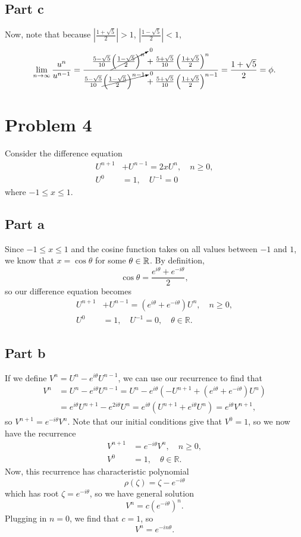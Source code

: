 \documentclass{article}
\begin{document}
\subsection{Part c}
Now, note that because $\left|\frac{1+\sqrt{5}}{2}\right|>1$, $\left|\frac{1-\sqrt{5}}{2}\right|<1$,
\begin{align*}
\lim_{n\to\infty}\frac{u^n}{u^{n-1}}=\frac{\frac{5-\sqrt{5}}{10}\cancelto{0}{\left(\frac{1-\sqrt{5}}{2}\right)^n}+\frac{5+\sqrt{5}}{10}\left(\frac{1+\sqrt{5}}{2}\right)^n}{\frac{5-\sqrt{5}}{10}\cancelto{0}{\left(\frac{1-\sqrt{5}}{2}\right)^{n-1}}+\frac{5+\sqrt{5}}{10}\left(\frac{1+\sqrt{5}}{2}\right)^{n-1}}=\frac{1+\sqrt{5}}{2}=\phi.
\end{align*}

\section{Problem 4}
Consider the difference equation
\begin{align*}
	U^{n+1} &+ U^{n-1} = 2x U^n, \quad n \geq 0,\\
	U^0 &= 1, \quad U^{-1} = 0
\end{align*}
where $-1 \leq x \leq 1$.

\subsection{Part a}
Since $-1 \leq x \leq 1$ and the cosine function takes on all values between $-1$ and $1$, we know that $x=\cos\theta$ for some $\theta\in\mathbb{R}$. By definition,
\[
\cos\theta=\frac{e^{i\theta}+e^{-i\theta}}{2},
\]
so our difference equation becomes
\begin{align*}
	U^{n+1} &+ U^{n-1} = (e^{i \theta} + e^{- i \theta}) U^n, \quad n \geq 0,\\
	U^0 &= 1, \quad U^{-1} = 0, \quad \theta \in \mathbb R.
\end{align*}

\subsection{Part b}
If we define $V^n = U^n - e^{i \theta} U^{n-1}$, we can use our recurrence to find that
\begin{align*}
V^n &= U^n - e^{i \theta} U^{n-1}=U^n -e^{i \theta}(-U^{n+1}+(e^{i \theta} + e^{- i \theta}) U^n)\\&=
e^{i\theta}U^{n+1}-e^{2i\theta}U^n=e^{i\theta}(U^{n+1}+e^{i\theta}U^n)=e^{i\theta}V^{n+1},
\end{align*}
so $V^{n+1}=e^{-i\theta}V^n$. Note that our initial conditions give that $V^0=1$, so we now have the recurrence 
\begin{align*}
	V^{n+1}&=e^{-i\theta}V^n, \quad n \geq 0,\\
	V^0 &= 1, \quad \theta \in \mathbb R.
\end{align*}
Now, this recurrence has characteristic polynomial
\[
\rho(\zeta)=\zeta-e^{-i\theta}
\]
which has root $\zeta=e^{-i\theta}$, so we have general solution
\[
V^n=c(e^{-i\theta})^n.
\]
Plugging in $n=0$, we find that $c=1$, so 
\[
V^n=e^{-in\theta}.
\] 
\end{document}
